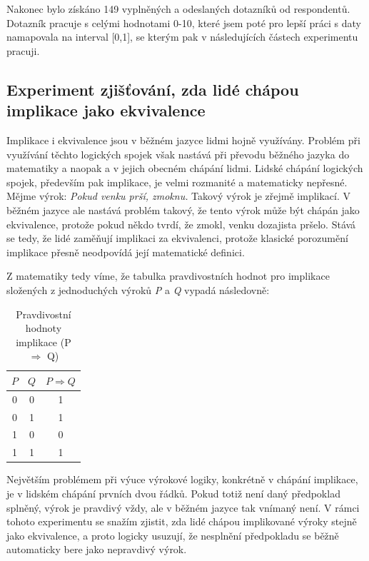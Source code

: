 Nakonec bylo získáno 149 vyplněných a odeslaných dotazník\r u od respondent\r u. Dotazník pracuje s celými hodnotami 0-10, které jsem poté pro lepší práci s daty namapovala na interval [0,1], se kterým pak v následujících částech experimentu pracuji.

\subsection{Experiment zjiš\v tování, zda lidé chápou implikace jako ekvivalence}
Implikace i ekvivalence jsou v běžném jazyce lidmi hojně využívány. Problém při využívání těchto logických spojek však nastává při převodu běžného jazyka do matematiky a naopak a v jejich obecném chápání lidmi. Lidské chápání logických spojek, především pak implikace, je velmi rozmanité a matematicky nepřesné. Mějme výrok: \textit{\clqq Pokud venku prší, zmoknu.\crqq } Takový výrok je zřejmě implikací. V běžném jazyce ale nastává problém takový, že tento výrok m\r uže být chápán jako ekvivalence, protože pokud někdo tvrdí, že zmokl, venku dozajista pršelo. Stává se tedy, že lidé zamě\v nují implikaci za ekvivalenci, protože klasické porozumění implikace přesně neodpovídá její matematické definici.


Z matematiky tedy víme, že tabulka pravdivostních hodnot pro implikace složených z jednoduchých výrok\r u \textit{P} a \textit{Q} vypadá následovně:
\begin{table}[H]
    \centering
    \begin{tabular}{|c|c|c|}
        \hline
        \(P\) & \(Q\) & \(P \Rightarrow Q\) \\ 
        \hline
        0 & 0 & 1 \\ 
        \hline
        0 & 1 & 1 \\ 
        \hline
        1 & 0 & 0 \\ 
        \hline
        1 & 1 & 1 \\ 
        \hline
    \end{tabular}
    \caption{Pravdivostní hodnoty implikace (P $\Rightarrow$ Q)}
\end{table}

Největším problémem při výuce výrokové logiky, konkrétně v chápání implikace, je v lidském chápání prvních dvou řádk\r u. Pokud totiž není daný předpoklad splněný, výrok je pravdivý vždy, ale v běžném jazyce tak vnímaný není. V rámci tohoto experimentu se snažím zjistit, zda lidé chápou implikované výroky stejně jako ekvivalence, a proto logicky usuzují, že nesplnění předpokladu se běžně automaticky bere jako nepravdivý výrok.

